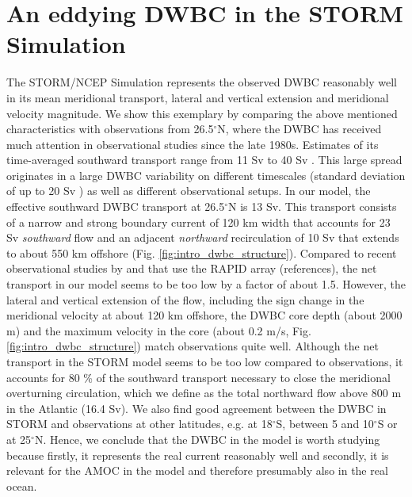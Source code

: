 \documentclass{ametsoc}
\begin{document}
\section{An eddying DWBC in the STORM Simulation} 
The STORM/NCEP Simulation represents the observed DWBC reasonably well in its mean meridional transport, lateral and vertical extension and meridional velocity magnitude. We show this exemplary by comparing the above mentioned characteristics with observations from 26.5$^\circ$N, where the DWBC has received much attention in observational studies since the late 1980s. Estimates of its time-averaged southward transport range from 11 Sv \citep{Meinen2006} to 40 Sv \citep{Lee1996}. This large spread originates in a large DWBC variability on different timescales (standard deviation of up to 20 Sv \citep{Bryden2005a}) as well as different observational setups. In our model, the effective southward DWBC transport at 26.5$^\circ$N is 13 Sv. This transport consists of a narrow and strong boundary current of 120 km width that accounts for 23 Sv \textit{southward} flow and an adjacent \textit{northward} recirculation of 10 Sv that extends to about 550 km offshore (Fig. \ref{fig:intro_dwbc_structure}).  Compared to recent observational studies by \citet{Meinen2013} and \citet{Johns2008} that use the RAPID array (references), the net transport in our model seems to be too low by a factor of about 1.5. However, the lateral and vertical extension of the flow, including the sign change in the meridional velocity at about 120 km offshore, the DWBC core depth (about 2000 m) and the maximum velocity in the core (about 0.2 m/s, Fig. \ref{fig:intro_dwbc_structure}) match observations \citep{Lee1996, Bryden2005a} quite well. Although the net transport in the STORM model seems to be too low compared to observations, it accounts for 80 \% of the southward transport necessary to close the meridional overturning circulation, which we define as the total northward flow above 800 m in the Atlantic (16.4 Sv). We also find good agreement between the DWBC in STORM and observations at other latitudes, e.g. \citet{Weatherly2000} at 18$^\circ$S, \citet{Schott2002} between 5 and 10$^\circ$S or \citet{Bryden2005} at 25$^\circ$N. Hence, we conclude that the DWBC in the model is worth studying because firstly, it represents the real current reasonably well and secondly, it is relevant for the AMOC in the model and therefore presumably also in the real ocean. \\
\end{document}

